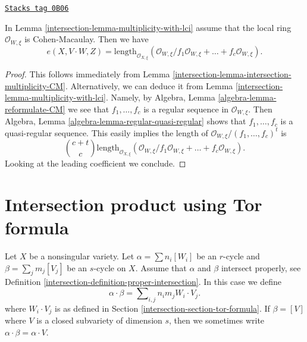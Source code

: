 \begin{lemma}
\label{intersection-lemma-multiplicity-lci-CM}
\href{https://stacks.math.columbia.edu/tag/0B06}{\texttt{Stacks tag 0B06}}

In Lemma \ref{intersection-lemma-multiplicity-with-lci} assume that
the local ring $\mathcal{O}_{W, \xi}$ is Cohen-Macaulay. Then we
have
$$
e(X, V \cdot W, Z) =
\text{length}_{\mathcal{O}_{X, \xi}} (\mathcal{O}_{W, \xi}/
f_1\mathcal{O}_{W, \xi} + \ldots + f_c\mathcal{O}_{W, \xi}).
$$
\end{lemma}

\begin{proof}

This follows immediately from Lemma \ref{intersection-lemma-intersection-multiplicity-CM}.
Alternatively, we can deduce it from Lemma \ref{intersection-lemma-multiplicity-with-lci}.
Namely, by Algebra, Lemma \ref{algebra-lemma-reformulate-CM}
we see that $f_1, \ldots, f_c$ is a regular sequence in
$\mathcal{O}_{W, \xi}$. Then
Algebra, Lemma \ref{algebra-lemma-regular-quasi-regular} shows that
$f_1, \ldots, f_c$ is a quasi-regular sequence.
This easily implies the length of
$\mathcal{O}_{W, \xi}/(f_1, \ldots, f_c)^t$ is
$$
{c + t \choose c}
\text{length}_{\mathcal{O}_{X, \xi}} (\mathcal{O}_{W, \xi}/
f_1\mathcal{O}_{W, \xi} + \ldots + f_c\mathcal{O}_{W, \xi}).
$$
Looking at the leading coefficient we conclude.
\end{proof}

\section{Intersection product using Tor formula}
\label{intersection-section-intersection-product}
Let $X$ be a nonsingular variety. Let
$\alpha = \sum n_i [W_i]$ be an $r$-cycle and
$\beta = \sum_j m_j [V_j]$ be an $s$-cycle on $X$.
Assume that $\alpha$ and $\beta$ intersect properly, see
Definition \ref{intersection-definition-proper-intersection}.
In this case we define
$$
\alpha \cdot \beta = \sum\nolimits_{i,j} n_i m_j W_i \cdot V_j.
$$
where $W_i \cdot V_j$ is as defined in Section \ref{intersection-section-tor-formula}.
If $\beta = [V]$ where $V$ is a closed subvariety of dimension $s$,
then we sometimes write $\alpha \cdot \beta = \alpha \cdot V$.

